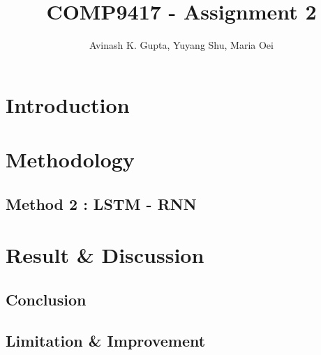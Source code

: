\documentclass[11pt, oneside]{article}   	%
\title{COMP9417 - Assignment 2}
\author{Avinash K. Gupta, Yuyang Shu, Maria Oei}
\begin{document}
\maketitle

\justify
\section{Introduction}



\section{Methodology}





\pagebreak
\subsection{Method 2 : LSTM - RNN}


\section{Result \& Discussion}
%

\subsection{Conclusion}
\subsection{Limitation \& Improvement}
\end{document}
